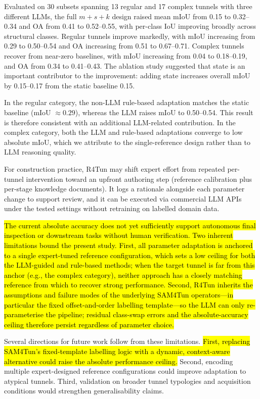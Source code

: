 \documentclass[a4paper,fleqn]{cas-dc}
\begin{document}
{Evaluated on 30 subsets spanning 13 regular and 17 complex tunnels with three different LLMs, the full \mbox{$m+s+k$} design raised mean mIoU from 0.15 to 0.32--0.34 and OA from 0.41 to 0.52--0.55, with per-class IoU improving broadly across structural classes. Regular tunnels improve markedly, with mIoU increasing from 0.29 to 0.50--0.54 and OA increasing from 0.51 to 0.67--0.71. Complex tunnels recover from near-zero baselines, with mIoU increasing from 0.04 to 0.18--0.19, and OA from 0.34 to 0.41--0.43. The ablation study suggested that state is an important contributor to the improvement: adding state increases overall mIoU by 0.15--0.17 from the static baseline 0.15.

In the regular category, the non-LLM rule-based adaptation matches the static baseline (mIoU $\approx 0.29$), whereas the LLM raises mIoU to 0.50--0.54. This result is therefore consistent with an additional LLM-related contribution. In the complex category, both the LLM and rule-based adaptations converge to low absolute mIoU, which we attribute to the single-reference design rather than to LLM reasoning quality.

For construction practice, R4Tun may shift expert effort from repeated per-tunnel intervention toward an upfront authoring step (reference calibration plus per-stage knowledge documents). It logs a rationale alongside each parameter change to support review, and it can be executed via commercial LLM APIs under the tested settings without retraining on labelled domain data.

\hl{The current absolute accuracy does not yet sufficiently support autonomous final inspection or downstream tasks without human verification. Two inherent limitations bound the present study. First, all parameter adaptation is anchored to a single expert-tuned reference configuration, which sets a low ceiling for both the LLM-guided and rule-based methods; when the target tunnel is far from this anchor (e.g., the complex category), neither approach has a closely matching reference from which to recover strong performance. Second, R4Tun inherits the assumptions and failure modes of the underlying SAM4Tun operators---in particular the fixed offset-and-order labelling template---so the LLM can only re-parameterise the pipeline; residual class-swap errors and the absolute-accuracy ceiling therefore persist regardless of parameter choice.}

Several directions for future work follow from these limitations. \hl{First, replacing SAM4Tun's fixed-template labelling logic with a dynamic, context-aware alternative could raise the absolute performance ceiling.} Second, encoding multiple expert-designed reference configurations could improve adaptation to atypical tunnels. Third, validation on broader tunnel typologies and acquisition conditions would strengthen generalisability claims.

}
\end{document}
